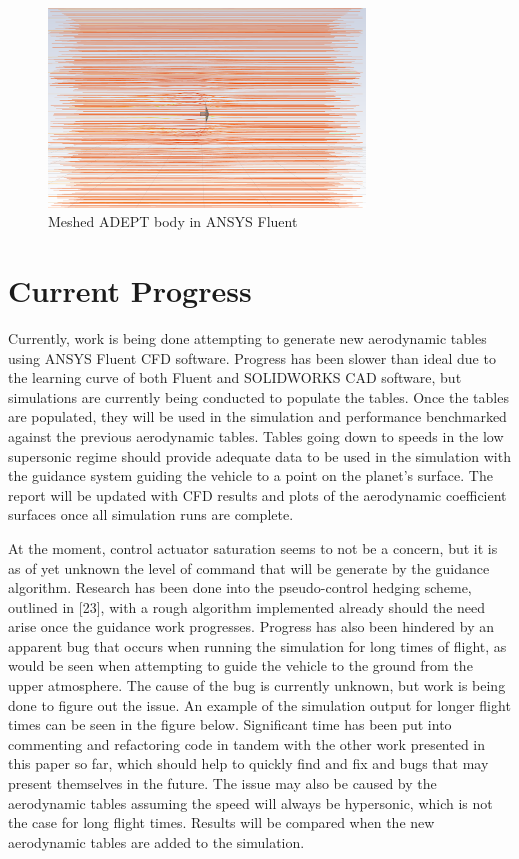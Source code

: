 \documentclass[12pt]{article}
\numberwithin{equation}{section}
\numberwithin{figure}{section}
\numberwithin{table}{section}
\begin{document}
\begin{figure}[H]
  \centering
  \includegraphics[width=0.75\textwidth]{Figures/ADEPT_In_CFD.png}
  \caption{Meshed ADEPT body in ANSYS Fluent}
  \label{fig:CFD}
\end{figure}

\section{Current Progress}
Currently, work is being done attempting to generate new aerodynamic tables using ANSYS Fluent CFD software. Progress has been slower than ideal due to the learning curve of both Fluent and SOLIDWORKS CAD software, but simulations are currently being conducted to populate the tables. Once the tables are populated, they will be used in the simulation and performance benchmarked against the previous aerodynamic tables. Tables going down to speeds in the low supersonic regime should provide adequate data to be used in the simulation with the guidance system guiding the vehicle to a point on the planet's surface. The report will be updated with CFD results and plots of the aerodynamic coefficient surfaces once all simulation runs are complete.

At the moment, control actuator saturation seems to not be a concern, but it is as of yet unknown the level of command that will be generate by the guidance algorithm. Research has been done into the pseudo-control hedging scheme, outlined in [23], with a rough algorithm implemented already should the need arise once the guidance work progresses. Progress has also been hindered by an apparent bug that occurs when running the simulation for long times of flight, as would be seen when attempting to guide the vehicle to the ground from the upper atmosphere. The cause of the bug is currently unknown, but work is being done to figure out the issue. An example of the simulation output for longer flight times can be seen in the figure below. Significant time has been put into commenting and refactoring code in tandem with the other work presented in this paper so far, which should help to quickly find and fix and bugs that may present themselves in the future. The issue may also be caused by the aerodynamic tables assuming the speed will always be hypersonic, which is not the case for long flight times. Results will be compared when the new aerodynamic tables are added to the simulation.
\end{document}

